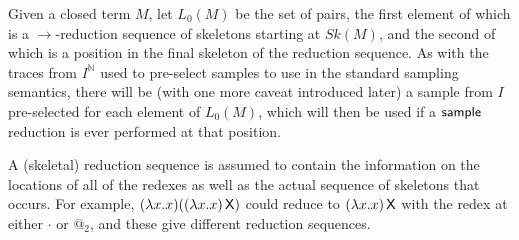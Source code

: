 Given a closed term $M$, let $L_0(M)$ be the set of pairs, the first element of which is a $\to$-reduction sequence of skeletons starting at $\mathit{Sk}(M)$, and the second of which is a position in the final skeleton of the reduction sequence. As with the traces from $I^{\mathbb N}$ used to pre-select samples to use in the standard sampling semantics, there will be (with one more caveat introduced later) a sample from $I$ pre-selected for each element of $L_0(M)$, which will then be used if a $\mathsf{sample}$ reduction is ever performed at that position.

A (skeletal) reduction sequence is assumed to contain the information on the locations of all of the redexes as well as the actual sequence of skeletons that occurs. For example, $(\lambda x. x) ((\lambda x. x) \, \mathsf{X})$ could reduce to $(\lambda x. x) \, \mathsf{X}$ with the redex at either $\cdot$ or $@_2$, and these give different reduction sequences.

